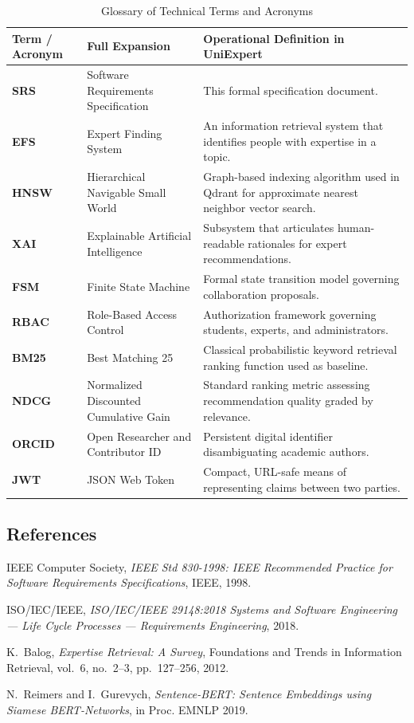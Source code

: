 \documentclass[11pt,a4paper]{article}
\begin{document}
\begin{table}[H]
\centering
\small
\caption{Glossary of Technical Terms and Acronyms}
\label{tab:glossary}
\begin{tabularx}{\textwidth}{@{}l p{4.2cm} X@{}}
\toprule
\textbf{Term / Acronym} & \textbf{Full Expansion} & \textbf{Operational Definition in UniExpert} \\
\midrule
\textbf{SRS} & Software Requirements Specification & This formal specification document. \\
\textbf{EFS} & Expert Finding System & An information retrieval system that identifies people with expertise in a topic. \\
\textbf{HNSW} & Hierarchical Navigable Small World & Graph-based indexing algorithm used in Qdrant for approximate nearest neighbor vector search. \\
\textbf{XAI} & Explainable Artificial Intelligence & Subsystem that articulates human-readable rationales for expert recommendations. \\
\textbf{FSM} & Finite State Machine & Formal state transition model governing collaboration proposals. \\
\textbf{RBAC} & Role-Based Access Control & Authorization framework governing students, experts, and administrators. \\
\textbf{BM25} & Best Matching 25 & Classical probabilistic keyword retrieval ranking function used as baseline. \\
\textbf{NDCG} & Normalized Discounted Cumulative Gain & Standard ranking metric assessing recommendation quality graded by relevance. \\
\textbf{ORCID} & Open Researcher and Contributor ID & Persistent digital identifier disambiguating academic authors. \\
\textbf{JWT} & JSON Web Token & Compact, URL-safe means of representing claims between two parties. \\
\bottomrule
\end{tabularx}
\end{table}

\subsection{References}
\begin{enumerate}[label={[\arabic*]},noitemsep]
    \item IEEE Computer Society, \emph{IEEE Std 830-1998: IEEE Recommended Practice for Software Requirements Specifications}, IEEE, 1998.
    \item ISO/IEC/IEEE, \emph{ISO/IEC/IEEE 29148:2018 Systems and Software Engineering --- Life Cycle Processes --- Requirements Engineering}, 2018.
    \item K.~Balog, \emph{Expertise Retrieval: A Survey}, Foundations and Trends in Information Retrieval, vol.~6, no.~2--3, pp.~127--256, 2012.
    \item N.~Reimers and I.~Gurevych, \emph{Sentence-BERT: Sentence Embeddings using Siamese BERT-Networks}, in Proc. EMNLP 2019.
\end{enumerate}
\end{document}

